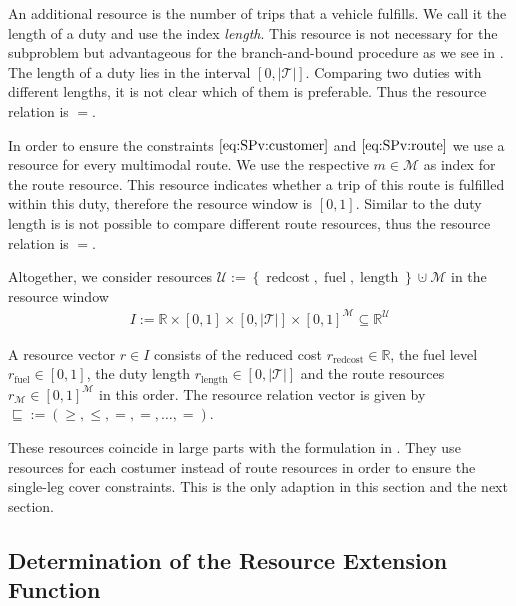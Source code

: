 An additional resource is the number of trips that a vehicle fulfills. We call it the length of a duty and use the index \emph{length}. This resource is not necessary for the subproblem but advantageous for the branch-and-bound procedure as we see in . The length of a duty lies in the interval $[0,|\mathcal{T}|]$. Comparing two duties with different lengths, it is not clear which of them is preferable. Thus the resource relation is $=$.

In order to ensure the constraints $\eqref{eq:SPv:customer}$ and $\eqref{eq:SPv:route}$ we use a resource for every multimodal route. We use the respective $m\in\mathcal{M}$ as index for the route resource. This resource indicates whether a trip of this route is fulfilled within this duty, therefore the resource window is $[0,1]$. Similar to the duty length is is not possible to compare different route resources, thus the resource relation is $=$.

Altogether, we consider resources ${\mathcal{U} := \left\{\operatorname{redcost},\operatorname{fuel},\operatorname{length}\right\}\cupdot\mathcal{M}}$ in the resource window
\begin{align*}
	I := \mathbb{R}\times[0,1]\times[0,|\mathcal{T}|]\times[0,1]^{\mathcal{M}}\subseteq\mathbb{R}^{\mathcal{U}}
\end{align*}

A resource vector $r\in I$ consists of the reduced cost ${r_{\operatorname{redcost}}\in\mathbb{R}}$, the fuel level ${r_{\operatorname{fuel}}\in[0,1]}$, the duty length ${r_{\operatorname{length}}\in[0,|\mathcal{T}|]}$ and the route resources ${r_{\mathcal{M}}\in[0,1]^{\mathcal{M}}}$ in this order. The resource relation vector is given by ${\sqsubseteq := \left(\geq,\leq,=,=,\dots,=\right)}$.

These resources coincide in large parts with the formulation in \cite{Kaiser}. They use resources for each costumer instead of route resources in order to ensure the single-leg cover constraints. This is the only adaption in this section and the next section.


\subsection{Determination of the Resource Extension Function}
\label{sec:ref}

